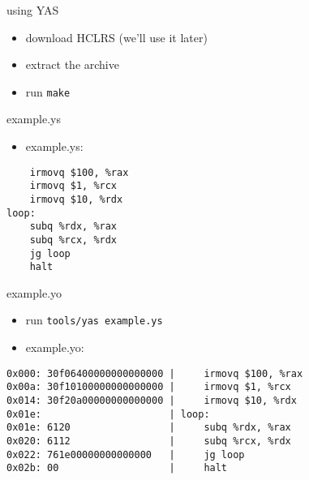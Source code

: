 \begin{frame}{using YAS}
    \begin{itemize}
    \item download HCLRS (we'll use it later)
    \item extract the archive
    \item run \texttt{make}
    \end{itemize}
\end{frame}

\begin{frame}[fragile,label=exampleYs]{example.ys}
    \begin{itemize}
    \item example.ys:
    \end{itemize}
\begin{Verbatim}
    irmovq $100, %rax
    irmovq $1, %rcx
    irmovq $10, %rdx
loop:
    subq %rdx, %rax 
    subq %rcx, %rdx
    jg loop
    halt
\end{Verbatim}
\end{frame}

\begin{frame}[fragile,label=exmapleYo]{example.yo}
    \begin{itemize}
    \item run \texttt{tools/yas example.ys}
    \item example.yo:
    \end{itemize}
\begin{Verbatim}
0x000: 30f06400000000000000 |     irmovq $100, %rax
0x00a: 30f10100000000000000 |     irmovq $1, %rcx
0x014: 30f20a00000000000000 |     irmovq $10, %rdx
0x01e:                      | loop:
0x01e: 6120                 |     subq %rdx, %rax 
0x020: 6112                 |     subq %rcx, %rdx
0x022: 761e00000000000000   |     jg loop
0x02b: 00                   |     halt
\end{Verbatim}
\end{frame}
